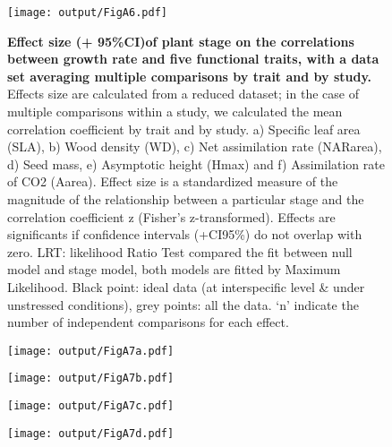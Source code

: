 \documentclass[a4paper]{article}\usepackage[]{graphicx}\usepackage[]{color}
\begin{document}
\begin{Appendix}
\begin{Supplemnetary material}
\begin{figure}[htbp]
\centering
\texttt{[image: output/FigA6.pdf]}
\caption{\textbf{Effect size (+ 95\%CI)of plant stage on the
correlations between growth rate and five functional traits, with a data set averaging multiple comparisons by trait and by study.} Effects size are calculated from a reduced dataset; in the case of multiple comparisons within a study, we calculated the mean correlation coefficient by trait and by study. a) Specific leaf area (SLA), b) Wood density (WD), c) Net assimilation rate (NARarea), d) Seed mass, e) Asymptotic height (Hmax) and f) Assimilation rate of CO2 (Aarea). Effect size is a standardized measure of the magnitude of the relationship between a particular stage and the correlation coefficient z (Fisher's z-transformed). Effects are significants if confidence intervals (+CI95\%) do not overlap with zero. LRT: likelihood Ratio Test compared the fit between null model and stage model, both models are fitted by Maximum Likelihood. Black point: ideal data (at interspecific level \& under unstressed conditions), grey points: all the data. `n' indicate the number of independent comparisons for each effect.}
\label{FigA6}
\end{figure}


\begin{figure}[htbp]
\centering
\texttt{[image: output/FigA7a.pdf]}
\end{figure}

\begin{figure}[htbp]
\centering
\texttt{[image: output/FigA7b.pdf]}
\end{figure}

\begin{figure}[htbp]
\centering
\texttt{[image: output/FigA7c.pdf]}
\end{figure}

\begin{figure}[htbp]
\centering
\texttt{[image: output/FigA7d.pdf]}
\end{figure}


\end{Supplemnetary material}
\end{Appendix}
\end{document}
